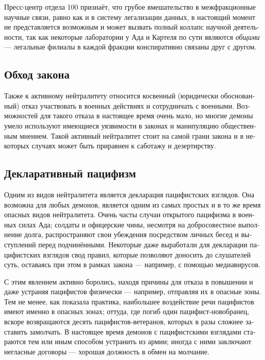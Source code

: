 \documentclass[a4paper,12pt,fleqn]{book}\usepackage{cooltooltips}\usepackage{polyglossia}\setdefaultlanguage[babelshorthands=true]{russian}\setotherlanguage{english}\defaultfontfeatures{Ligatures=TeX,Mapping=tex-text} \usepackage{xcolor}\definecolor{lightgray}{HTML}{bbbbbb}\color{lightgray}\newcommand{\ml}[3]{\textenglish{\textcolor{black}{#3}}}
\begin{document}
{Пресс-центр отдела 100 признаёт, что грубое вмешательство в межфракционные научные связи, равно как и в систему легализации данных, в настоящий момент не представляется возможным и может вызвать полный коллапс научной деятельности, так как некоторые лаборатории у Ада и Картеля по сути являются \emph{общими} --- легальные филиалы в каждой фракции конспиративно связаны друг с другом.

\subsection{Обход закона}

Также к активному нейтралитету относится косвенный (юридически обоснованный) отказ участвовать в военных действиях и сотрудничать с военными.
Возможностей для такого отказа в настоящее время очень мало, но многие демоны умело используют имеющиеся уязвимости в законах и манипуляцию общественным мнением.
Такой активный нейтралитет стоит на самой грани закона и в некоторых случаях может быть приравнен к саботажу и дезертирству.

\subsection{Декларативный пацифизм}

Одним из видов нейтралитета является декларация пацифистских взглядов.
Она возможна для любых демонов, является одним из самых простых и в то же время опасных видов нейтралитета.
Очень часты случаи открытого пацифизма в военных силах Ада;
солдаты и офицерские чины, несмотря на добросовестное выполнение долга, распространяют свои убеждения посредством личных бесед и выступлений перед подчинёнными.
Некоторые даже выработали для декларации пацифистских взглядов свод правил, которые позволяют доносить до слушателей суть, оставаясь при этом в рамках закона --- например, с помощью медиавирусов.

С этим явлением активно боролись, находя причины для отказа в повышении и даже устраняя пацифистов физически --- например, отправляя их в опасные зоны.
Тем не менее, как показала практика, наибольшее воздействие речи пацифистов имеют именно в опасных зонах;
оттуда, где погиб один пацифист-новобранец, вскоре возвращаются десять пацифистов-ветеранов, которых в разы сложнее заставить замолчать.
В настоящее время демонов с пацифистскими взглядами стараются тем или иным способом устранить из армии;
иногда с ними заключают негласные договоры --- хорошая должность в обмен на молчание.

}
\end{document}
